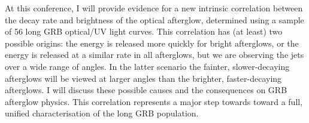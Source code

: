 


\bigskip



\bigskip

\noindent At this conference, I will provide evidence for a new intrinsic correlation between the decay rate and brightness of the optical afterglow, determined using a sample of 56 long GRB optical/UV light curves. This correlation has (at least) two possible origins: the energy is released more quickly for bright afterglows, or the energy is released at a similar rate in all afterglows, but we are observing the jets over a wide range of angles. In the latter scenario the fainter, slower-decaying afterglows will be viewed at larger angles than the brighter, faster-decaying afterglows. I will discuss these possible causes and the consequences on GRB afterglow physics. This correlation represents a major step towards toward a full, unified characterisation of the long GRB population.

